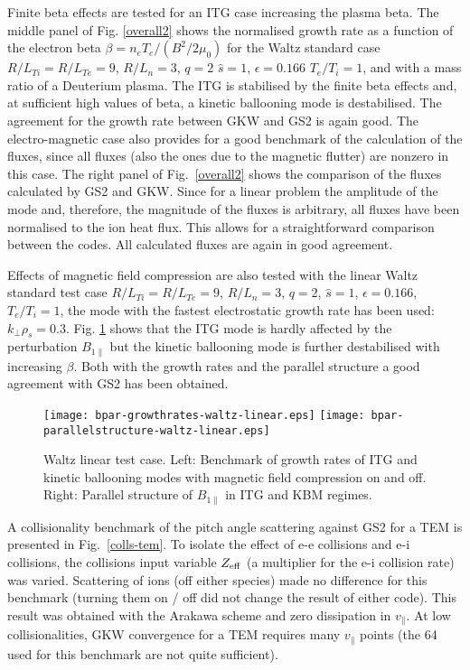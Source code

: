 Finite beta effects are tested for an ITG case increasing the plasma beta. The middle panel of 
Fig. \ref{overall2} shows the normalised growth rate as a function of the electron beta $\beta = n_e T_e 
/ (B^2 / 2 \mu_0)$ for the Waltz standard case $R/L_{Ti} = R/ L_{Te} = 9$, $R/ L_n = 3$, $q = 2$
$\hat s = 1$, $\epsilon = 0.166$ $T_e/T_i = 1$, and with a mass ratio of a Deuterium plasma. The ITG is 
stabilised by the finite beta effects and, at sufficient high values of beta, a kinetic ballooning 
mode is destabilised. The agreement for the growth rate between GKW and GS2 is again good. 
The electro-magnetic case also provides for a good benchmark of the calculation of the fluxes, since 
all fluxes (also the ones due to the magnetic flutter) are nonzero in this case. The right panel of 
Fig.~\ref{overall2} shows the comparison of the fluxes calculated by GS2 and GKW. Since for 
a linear problem the amplitude of the mode and, therefore, the magnitude of the fluxes is arbitrary, 
all fluxes have been normalised to the ion heat flux. This allows for a straightforward comparison 
between the codes. All calculated fluxes are again in good agreement. 

Effects of magnetic field compression are also tested with the linear Waltz standard test case $R/L_{Ti} = R/ L_{Te} = 9$, $R/ L_n = 3$, $q = 2$, $\hat s = 1$, $\epsilon = 0.166$, $T_e/T_i = 1$, the mode with the fastest electrostatic growth rate has been used: $k_{\perp} \rho_s = 0.3$. Fig. \ref{bpar-bm} shows that the ITG mode is hardly affected by the perturbation $B_{1 \parallel}$ but the kinetic ballooning mode is further destabilised with increasing $\beta$. Both with the growth rates and the parallel structure a good agreement with GS2 has been obtained.

\begin{figure}[htb] 
\begin{center}
\texttt{[image: bpar-growthrates-waltz-linear.eps]}
\texttt{[image: bpar-parallelstructure-waltz-linear.eps]}
\caption{Waltz linear test case. Left: Benchmark of growth rates of ITG and kinetic ballooning modes with magnetic field compression on and off. Right: Parallel structure of $B_{1 \parallel}$ in ITG and KBM regimes.} 
\label{bpar-bm}
\end{center}
\end{figure}

A collisionality benchmark of the pitch angle scattering against GS2 for a TEM is presented in Fig.~\ref{colls-tem}.  
To isolate the effect of e-e collisions and e-i collisions, the collisions input
variable $Z_{\rm eff}$
(a multiplier for the e-i collision rate) was varied.  Scattering of ions (off either species) made no difference for this benchmark 
(turning them on / off did not change the result of either code). This result was obtained with the Arakawa scheme and zero dissipation in $v_\parallel$. At low collisionalities, GKW convergence for a TEM requires many $v_\parallel$ points (the 64 used for this benchmark are not quite sufficient). 

